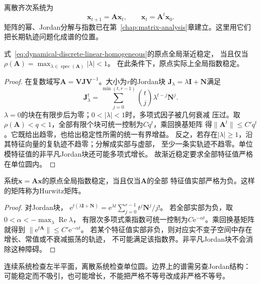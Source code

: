 离散齐次系统为
\begin{equation}
  \bm x_{t+1}=\bm A\bm x_t,\qquad \bm x_t=\bm A^t\bm x_0.
  \label{eq:dynamical-discrete-linear-homogeneous}
\end{equation}
矩阵的幂、Jordan分解与指数已在第~\ref{chap:matrix-analysis}章建立。这里用它们
把长期轨迹问题化成谱的位置。
\begin{theorem}[离散线性系统的渐近稳定性]
  \label{thm:dynamical-discrete-spectral-stability}
  式~\eqref{eq:dynamical-discrete-linear-homogeneous}的原点全局渐近稳定，
  当且仅当$\rho(\bm A)=\max_{\lambda\in\operatorname{spec}(\bm A)}|\lambda|<1$。
  在此条件下，原点实际上全局指数稳定。
\end{theorem}
\begin{proof}
  在复数域写$\bm A=\bm V\bm J\bm V^{-1}$。大小为$r$的Jordan块
  $\bm J_\lambda=\lambda\bm I+\bm N$满足
  \[
    \bm J_\lambda^t
      =\sum_{j=0}^{\min(t,r-1)}\binom tj\lambda^{t-j}\bm N^j.
  \]
  $\lambda=0$的块在有限步后为零；$0<|\lambda|<1$时，多项式因子被几何衰减
  压过。取$\rho(\bm A)<q<1$，全部有限个块可统一控制为$Cq^t$，乘回换基矩阵
  得$\|\bm A^t\|\leq C' q^t$。它既给出趋零，也给出稳定性所需的统一有界增益。
  反之，若存在$|\lambda|\geq1$，沿其特征向量的复轨迹不趋零；分解成实部与虚部，
  至少一条实轨迹不趋零。单位模特征值的非平凡Jordan块还可能多项式增长。
  故渐近稳定要求全部特征值严格在单位圆内。
\end{proof}

\begin{theorem}[连续线性系统的指数稳定性]
  \label{thm:dynamical-continuous-spectral-stability}
  系统$\dot{\bm x}=\bm A\bm x$的原点全局指数稳定，当且仅当$\bm A$的全部
  特征值实部严格为负。这样的矩阵称为Hurwitz矩阵。
\end{theorem}
\begin{proof}
  对Jordan块，
  $\mathrm e^{t(\lambda\bm I+\bm N)}
   =\mathrm e^{\lambda t}\sum_{j=0}^{r-1}t^j\bm N^j/j!$。
  若全部实部为负，取$0<\alpha<-\max_\lambda\operatorname{Re}\lambda$，
  有限次多项式乘指数可统一控制为$C\mathrm e^{-\alpha t}$。乘回换基矩阵就得到
  $\|\mathrm e^{t\bm A}\|\leq C'\mathrm e^{-\alpha t}$。
  若某个特征值实部非负，则对应实不变子空间中存在增长、常值或不衰减振荡的轨迹，
  不可能满足该指数界。非平凡Jordan块不会消除这种障碍。
\end{proof}
连续系统检查左半平面，离散系统检查单位圆。边界上的谱需另查Jordan结构：
可能稳定而不吸引，也可能增长，不能把严格不等号改成非严格不等号。

